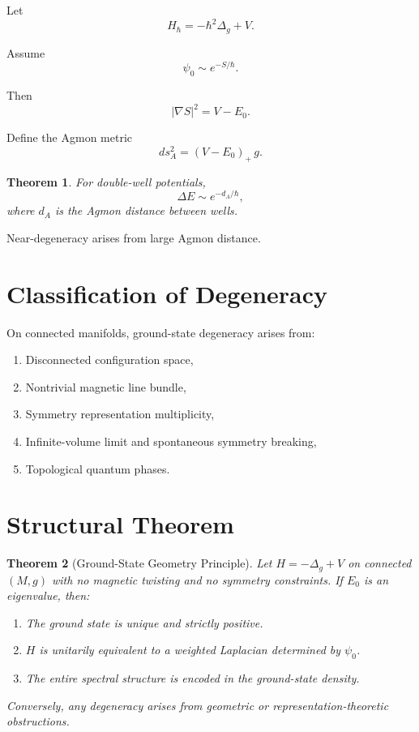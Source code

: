 \documentclass[11pt]{article}
\newtheorem{theorem}{Theorem}[section]
\begin{document}
Let
\[
H_\hbar = -\hbar^2\Delta_g + V.
\]

Assume
\[
\psi_0 \sim e^{-S/\hbar}.
\]

Then
\[
|\nabla S|^2 = V - E_0.
\]

Define the Agmon metric
\[
ds_A^2 = (V - E_0)_+\, g.
\]

\begin{theorem}
For double-well potentials,
\[
\Delta E \sim e^{-d_A/\hbar},
\]
where $d_A$ is the Agmon distance between wells.
\end{theorem}

Near-degeneracy arises from large Agmon distance.

\section{Classification of Degeneracy}

On connected manifolds, ground-state degeneracy arises from:

\begin{enumerate}
\item Disconnected configuration space,
\item Nontrivial magnetic line bundle,
\item Symmetry representation multiplicity,
\item Infinite-volume limit and spontaneous symmetry breaking,
\item Topological quantum phases.
\end{enumerate}

\section{Structural Theorem}

\begin{theorem}[Ground-State Geometry Principle]
Let $H=-\Delta_g+V$ on connected $(M,g)$ with no magnetic twisting and no symmetry constraints.
If $E_0$ is an eigenvalue, then:
\begin{enumerate}
\item The ground state is unique and strictly positive.
\item $H$ is unitarily equivalent to a weighted Laplacian determined by $\psi_0$.
\item The entire spectral structure is encoded in the ground-state density.
\end{enumerate}
Conversely, any degeneracy arises from geometric or representation-theoretic obstructions.
\end{theorem}
\end{document}
